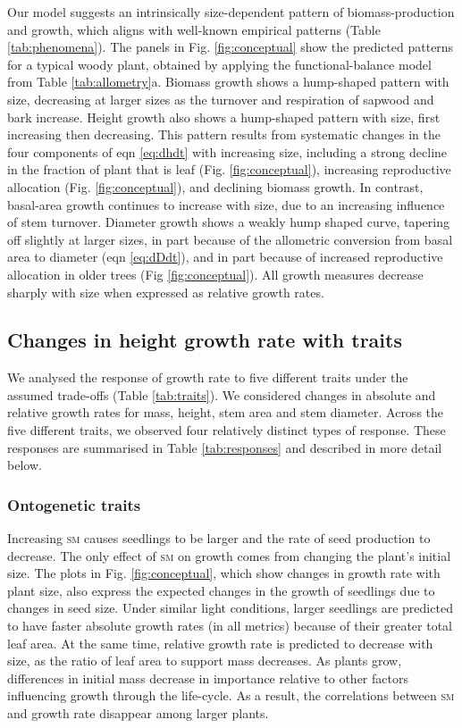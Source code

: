 \documentclass[9pt,twocolumn,twoside,lineno]{pnas-new}
\newcommand{\seed}{\textsc{sm}}
\begin{document}
Our model suggests an intrinsically size-dependent pattern of biomass-production and growth, which aligns with well-known empirical patterns (Table \ref{tab:phenomena}). The panels in Fig. \ref{fig:conceptual} show the predicted patterns for a typical woody plant, obtained by applying the functional-balance model from Table \ref{tab:allometry}a. Biomass growth shows a hump-shaped pattern with size, decreasing at larger sizes as the turnover and respiration of sapwood and bark increase. Height growth also shows a hump-shaped pattern with size, first increasing then decreasing. This pattern results from systematic changes in the four components of eqn \ref{eq:dhdt} with increasing size, including a strong decline in the fraction of plant that is leaf (Fig. \ref{fig:conceptual}), increasing reproductive allocation (Fig. \ref{fig:conceptual}), and declining biomass growth. In contrast, basal-area growth continues to increase with size, due to an increasing influence of stem turnover. Diameter growth shows a weakly hump shaped curve, tapering off slightly at larger sizes, in part because of the allometric conversion from basal area to diameter (eqn \ref{eq:dDdt}), and in part because of increased reproductive allocation in older trees (Fig \ref{fig:conceptual}). All growth measures decrease sharply with size when expressed as relative growth rates.

\subsection{Changes in height growth rate with traits}

We analysed the response of growth rate to five different traits under the assumed trade-offs (Table \ref{tab:traits}). We considered changes in absolute and relative growth rates for mass, height, stem area and stem diameter. Across the five different traits, we observed four relatively distinct types of response. These responses are summarised in Table \ref{tab:responses} and described in more detail below.

\subsubsection{Ontogenetic traits}  Increasing {\seed} causes seedlings to be larger and the rate of seed production to decrease. The only effect of {\seed} on growth comes from changing the plant's initial size. The plots in Fig. \ref{fig:conceptual}, which show changes in growth rate with plant size, also express the expected changes in the growth of seedlings due to changes in seed size. Under similar light conditions, larger seedlings are predicted to have faster absolute growth rates (in all metrics) because of their greater total leaf area. At the same time, relative growth rate is predicted to decrease with size, as the ratio of leaf area to support mass decreases. As plants grow, differences in initial mass decrease in importance relative to other factors influencing growth through the life-cycle. As a result, the correlations between {\seed} and growth rate disappear among larger plants.
\end{document}
